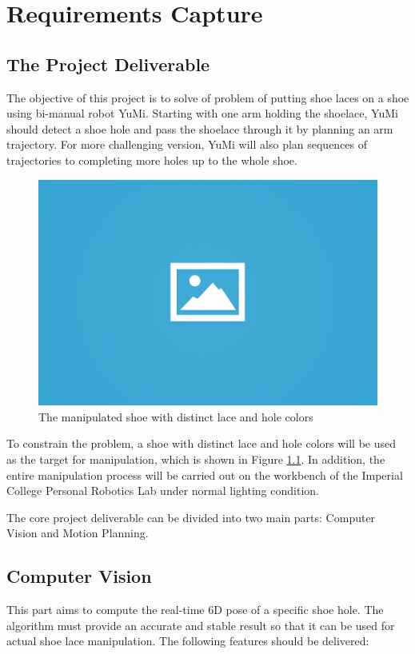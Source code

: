 \chapter{Requirements Capture}

\section{The Project Deliverable}
The objective of this project is to solve of problem of putting shoe laces on a shoe using bi-manual robot YuMi. Starting with one arm holding the shoelace, YuMi should detect a shoe hole and pass the shoelace through it by planning an arm trajectory. For more challenging version, YuMi will also plan sequences of trajectories to completing more holes up to the whole shoe.

\begin{figure}[H]
\centering
\includegraphics[width = 0.5\columnwidth]{images/ph.png}
\caption{The manipulated shoe with distinct lace and hole colors}
\label{shoe}
\end{figure}

To constrain the problem, a shoe with distinct lace and hole colors will be used as the target for manipulation, which is shown in Figure \ref{shoe}. In addition, the entire manipulation process will be carried out on the workbench of the Imperial College Personal Robotics Lab under normal lighting condition.

The core project deliverable can be divided into two main parts: Computer Vision and Motion Planning.

\section{Computer Vision}
This part aims to compute the real-time 6D pose of a specific shoe hole. The algorithm must provide an accurate and stable result so that it can be used for actual shoe lace manipulation. The following features should be delivered:

